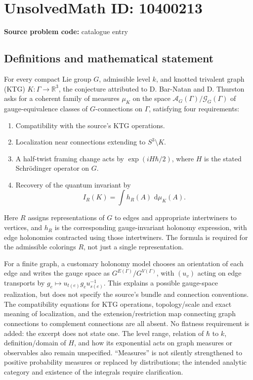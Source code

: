 \documentclass[11pt]{article}
\newcommand{\R}{\mathbb{R}}
\newcommand{\dd}{\,\mathrm{d}}
\begin{document}
\section*{UnsolvedMath ID: 10400213}
\textbf{Source problem code:} catalogue entry
\subsection{Definitions and mathematical statement}
For every compact Lie group \(G\), admissible level \(k\), and knotted trivalent graph (KTG) \(K:\Gamma\to\R^3\), the conjecture attributed to D. Bar-Natan and D. Thurston asks for a coherent family of measures \(\mu_K\) on the space \(\mathcal A_G(\Gamma)/\mathcal G_G(\Gamma)\) of gauge-equivalence classes of \(G\)-connections on \(\Gamma\), satisfying four requirements:
\begin{enumerate}
\item Compatibility with the source's KTG operations.
\item Localization near connections extending to \(S^3\setminus K\).
\item A half-twist framing change acts by \(\exp(iH\hbar/2)\), where \(H\) is the stated Schr\"odinger operator on \(G\).
\item Recovery of the quantum invariant by
\[I_R(K)=\int h_R(A)\,\dd\mu_K(A).\]
\end{enumerate}
Here \(R\) assigns representations of \(G\) to edges and appropriate intertwiners to vertices, and \(h_R\) is the corresponding gauge-invariant holonomy expression, with edge holonomies contracted using those intertwiners. The formula is required for the admissible colorings \(R\), not just a single representation.

For a finite graph, a customary holonomy model chooses an orientation of each edge and writes the gauge space as \(G^{E(\Gamma)}/G^{V(\Gamma)}\), with \((u_v)\) acting on edge transports by \(g_e\mapsto u_{t(e)}g_eu_{s(e)}^{-1}\). This explains a possible gauge-space realization, but does not specify the source's bundle and connection conventions. The compatibility equations for KTG operations, topology/scale and exact meaning of localization, and the extension/restriction map connecting graph connections to complement connections are all absent. No flatness requirement is added: the excerpt does not state one. The level range, relation of \(\hbar\) to \(k\), definition/domain of \(H\), and how its exponential acts on graph measures or observables also remain unspecified. ``Measures'' is not silently strengthened to positive probability measures or replaced by distributions; the intended analytic category and existence of the integrals require clarification.
\end{document}
